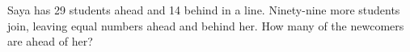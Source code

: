 Saya has 29 students ahead and 14 behind in a line. Ninety-nine more students join, leaving equal numbers ahead and behind her. How many of the newcomers are ahead of her?
